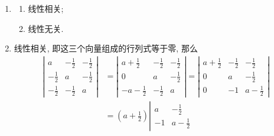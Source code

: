 % 
\begin{enumerate}
    \item %
        \begin{multicols}{2}
            \begin{enumerate}[(1)]
                \item %
                    线性相关;
                \item %
                    线性无关.
            \end{enumerate}
        \end{multicols}
    \item %
        线性相关, 即这三个向量组成的行列式等于零, 那么
        \begin{align*}
            \left|
                \begin{array}{ccc}
                    a & -\frac12 & -\frac12 \\
                    -\frac12 & a & -\frac12 \\
                    -\frac12 & -\frac12 & a
                \end{array}
            \right|
            &=
            \left|
                \begin{array}{ccc}
                    a+\frac12 & -\frac12 & -\frac12 \\
                    0 & a & -\frac12 \\
                    -a-\frac12 & -\frac12 & a
                \end{array}
            \right|
            =
            \left|
                \begin{array}{ccc}
                    a+\frac12 & -\frac12 & -\frac12 \\
                    0 & a & -\frac12 \\
                    0 & -1 & a-\frac12
                \end{array}
            \right| \\
            &=
            \left(a+\frac12\right)
            \left|
                \begin{array}{cc}
                    a & -\frac12 \\
                    -1 & a-\frac12
                \end{array}

\end{align*}
\end{enumerate}
